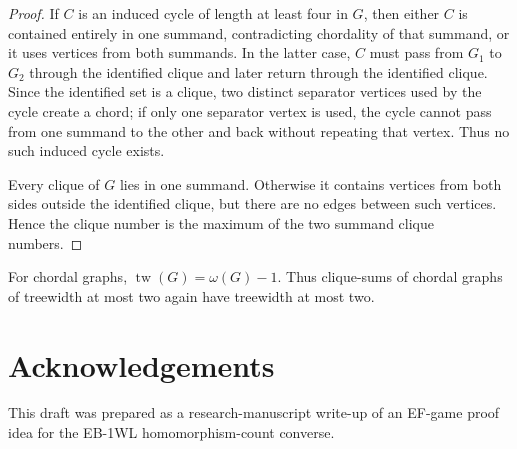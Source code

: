 \documentclass[11pt]{article}
\DeclareMathOperator{\tw}{tw}
\begin{document}
\begin{proof}
If $C$ is an induced cycle of length at least four in $G$, then either $C$ is contained entirely in one summand, contradicting chordality of that summand, or it uses vertices from both summands.  In the latter case, $C$ must pass from $G_1$ to $G_2$ through the identified clique and later return through the identified clique.  Since the identified set is a clique, two distinct separator vertices used by the cycle create a chord; if only one separator vertex is used, the cycle cannot pass from one summand to the other and back without repeating that vertex.  Thus no such induced cycle exists.

Every clique of $G$ lies in one summand.  Otherwise it contains vertices from both sides outside the identified clique, but there are no edges between such vertices.  Hence the clique number is the maximum of the two summand clique numbers.
\end{proof}

For chordal graphs, $\tw(G)=\omega(G)-1$.  Thus clique-sums of chordal graphs of treewidth at most two again have treewidth at most two.

\section*{Acknowledgements}
This draft was prepared as a research-manuscript write-up of an EF-game proof idea for the EB-1WL homomorphism-count converse.
\end{document}
